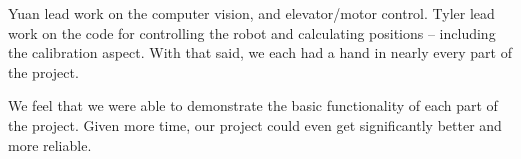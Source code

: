 \documentclass{article}
\begin{document}
Yuan lead work on the computer vision, and elevator/motor control. Tyler lead work on the code for controlling the robot and calculating positions -- including the calibration aspect. With that said, we each had a hand in nearly every part of the project.

We feel that we were able to demonstrate the basic functionality of each part of the project. Given more time, our project could even get significantly better and more reliable.
\end{document}
